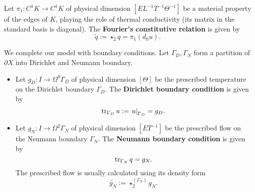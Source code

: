\begin{discussion}
\begin{itemize}
      Let $\pi_1 \colon C^1 K \to C^1 K$
      of physical dimension $[E L^{-1} T^{-1} \Theta^{-1}]$
      be a material property of the edges of $K$,
      playing the role of thermal conductivity
      (its matrix in the standard basis is diagonal).
      The \textbf{Fourier's constitutive relation} is given by
      \begin{equation}
        \tilde{q} := \star_2 q = \pi_1 (d_0 u).
      \end{equation}
  \end{itemize}
  We complete our model with boundary conditions.
  Let $\Gamma_D, \Gamma_N$ form a partition of $\partial X$
  into Dirichlet and Neumann boundary.
  \begin{itemize}
    \item
      Let $g_D \colon I \to \Omega^0 \Gamma_D$
      of physical dimension $[\Theta]$
      be the prescribed temperature on the Dirichlet boundary $\Gamma_D$.
      The \textbf{Dirichlet boundary condition} is given by
      \begin{equation}
        \mathop{\rm tr}\nolimits_{\Gamma_D} u := \left. u \right|_{\Gamma_D} = g_D.
      \end{equation}
    \item
      Let
        $g_N \colon I \to \Omega^2 \Gamma_N$
          of physical dimension $[E T^{-1}]$
          be the prescribed flow on the Neumann boundary $\Gamma_N$.
      The \textbf{Neumann boundary condition} is given by
      \begin{equation}
        \mathop{\rm tr}\nolimits_{\Gamma_N} q = g_N.
      \end{equation}
      The prescribed flow is usually calculated using its density form
      \begin{equation}
        \widetilde{g_N} := \star^{(\Gamma_N)}_2 g_N.
      \end{equation}
  \end{itemize}
\end{discussion}
